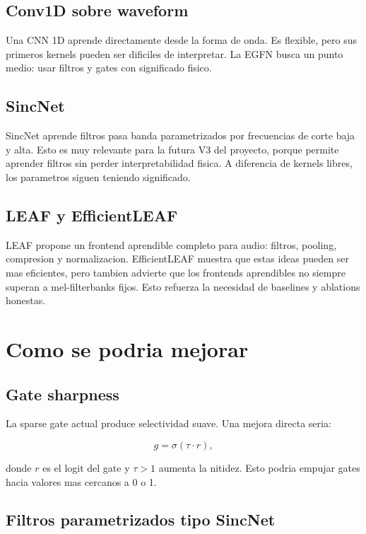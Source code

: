 \documentclass[11pt,letterpaper]{article}
\begin{document}
\subsection{Conv1D sobre waveform}

Una CNN 1D aprende directamente desde la forma de onda. Es flexible, pero sus
primeros kernels pueden ser dificiles de interpretar. La EGFN busca un punto
medio: usar filtros y gates con significado fisico.

\subsection{SincNet}

SincNet aprende filtros pasa banda parametrizados por frecuencias de corte baja
y alta. Esto es muy relevante para la futura V3 del proyecto, porque permite
aprender filtros sin perder interpretabilidad fisica. A diferencia de kernels
libres, los parametros siguen teniendo significado.

\subsection{LEAF y EfficientLEAF}

LEAF propone un frontend aprendible completo para audio: filtros, pooling,
compresion y normalizacion. EfficientLEAF muestra que estas ideas pueden ser
mas eficientes, pero tambien advierte que los frontends aprendibles no siempre
superan a mel-filterbanks fijos. Esto refuerza la necesidad de baselines y
ablations honestas.

\section{Como se podria mejorar}

\subsection{Gate sharpness}

La sparse gate actual produce selectividad suave. Una mejora directa seria:

\begin{equation}
    g = \sigma(\tau \cdot r),
\end{equation}

donde $r$ es el logit del gate y $\tau > 1$ aumenta la nitidez. Esto podria
empujar gates hacia valores mas cercanos a 0 o 1.

\subsection{Filtros parametrizados tipo SincNet}
\end{document}
